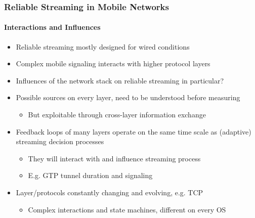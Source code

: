 \documentclass{beamer}
\begin{document}
\begin{frame}
	\frametitle{Reliable Streaming in Mobile Networks}
	\framesubtitle{Interactions and Influences}

	\begin{itemize}
		\item Reliable streaming mostly designed for wired conditions
		\item Complex mobile signaling interacts with higher protocol layers %
		\item Influences of the network stack on reliable streaming in particular?
		\item Possible sources on every layer, need to be understood before measuring
		\begin{itemize}
			\item But exploitable through cross-layer information exchange
		\end{itemize}
	\end{itemize}

	\begin{itemize}[<2->]
		\item Feedback loops of many layers operate on the same time scale as (adaptive) streaming decision processes
		\begin{itemize}
			\item They will interact with and influence streaming process
			\item E.g. GTP tunnel duration and signaling
		\end{itemize}
		\item Layer/protocols constantly changing and evolving, e.g. TCP
		\begin{itemize}
			\item Complex interactions and state machines, different on every OS
		\end{itemize}

	\end{itemize}
\end{frame}


\end{document}
